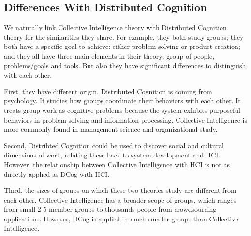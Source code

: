 \subsection{Differences With Distributed Cognition}
We naturally link Collective Intelligence theory with Distributed Cognition theory for the similarities they share. For example, they both study groups; they both have a specific goal to achieve: either problem-solving or product creation; and they all have three main elements in their theory: group of people, problems/goals and tools. But also they have significant differences to distinguish with each other.

First, they have different origin. Distributed Cognition is coming from psychology. It studies how groups coordinate their behaviors with each other. It treats group work as cognitive problems because the system exhibits purposeful behaviors in problem solving and information processing\cite{dcog}. Collective Intelligence is more commonly found in management science and organizational study. 

Second, Distribted Cognition could be used to discover social and cultural dimensions of work, relating these back to system development and HCI. However, the relationship between Collective Intelligence with HCI is not as directly applied as DCog with HCI.

Third, the sizes of groups on which these two theories study are different from each other. Collective Intelligence has a broader scope of groups, which ranges from small 2-5 member groups to thousands people from crowdsourcing applications. However, DCog is applied in much smaller groups than Collective Intelligence.





